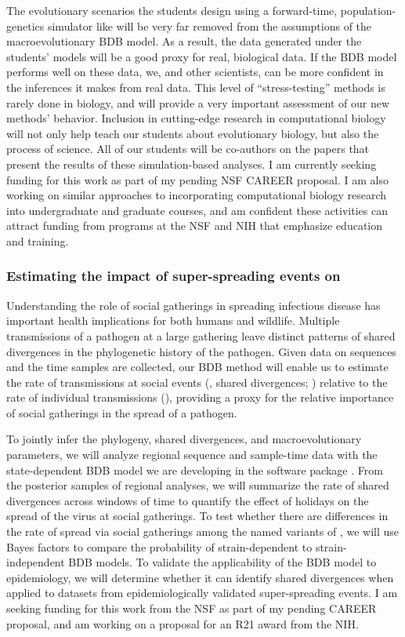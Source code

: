 The evolutionary scenarios the students design using
a forward-time, population-genetics simulator
like \slim will be very far removed from the assumptions
of the macroevolutionary BDB model.
As a result, the data generated under the students' models will be a good proxy
for real, biological data.
If the BDB model performs well on these data, we, and other scientists, can be
more confident in the inferences it makes from real data.
This level of ``stress-testing'' methods is rarely done in biology, and will
provide a very important assessment of our new methods' behavior.
Inclusion in cutting-edge research in computational biology will not only help
teach our students about evolutionary biology, but also the process of science.
All of our students will be co-authors on the papers that present the results
of these simulation-based analyses.
I am currently seeking funding for this work as part of my pending NSF CAREER
proposal.
I am also working on similar approaches to incorporating computational
biology research into undergraduate and graduate courses, and am
confident these activities can attract funding from programs at the NSF and NIH
that emphasize education and training.


\subsubsection*{Estimating the impact of super-spreading events on \covid}
Understanding the role of social gatherings in spreading infectious disease
has important health implications for both humans and wildlife.
Multiple transmissions of a pathogen at a large gathering leave distinct
patterns of shared divergences in the phylogenetic history of the pathogen.
Given data on sequences and the time samples are collected, our BDB method will
enable us to estimate the rate of transmissions at social events (\ie, shared
divergences; \burstrate) relative to the rate of individual transmissions
(\speciationrate),
providing a proxy for the relative importance of social gatherings
in the spread of a pathogen.

To jointly infer the \sarscov phylogeny, shared divergences,
and macroevolutionary parameters,
we will analyze regional sequence and sample-time data with the
state-dependent BDB model we are developing in the software package \revbayes.
From the posterior samples of regional analyses, we will summarize the rate of
shared divergences across windows of time to quantify the effect of holidays
on the spread of the virus at social gatherings.
To test whether there are differences in the rate of spread via social
gatherings among the named variants of \sarscov,
we will use Bayes factors to compare the probability of strain-dependent to
strain-independent BDB models.
To validate the applicability of the BDB model to epidemiology,
we will determine whether it can identify shared divergences when applied to
\sarscov datasets from epidemiologically validated super-spreading events.
I am seeking funding for this work from the NSF as part of my pending CAREER
proposal, and am working on a proposal for an R21 award from the NIH.


